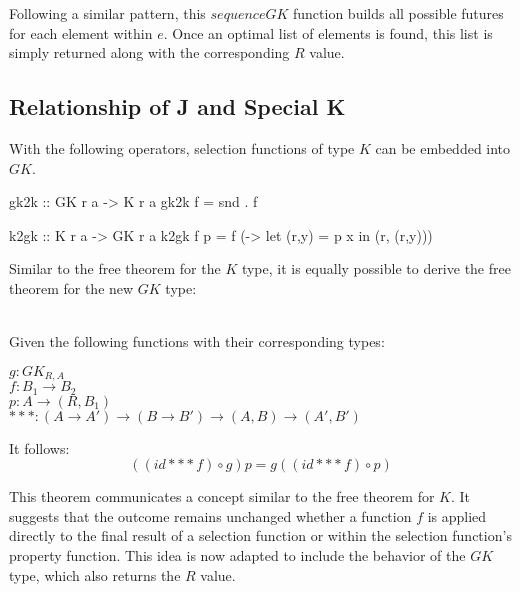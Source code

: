 \documentclass[runningheads]{llncs}
\newenvironment{reasoning}{\begin{adjustwidth}{0.2in}{}}{\end{adjustwidth}}
\newcommand{\ignore}[1]{}
\begin{document}
Following a similar pattern, this \(sequenceGK\) function builds all
possible futures for each element within \(e\). Once an optimal list of
elements is found, this list is simply returned along with the
corresponding \(R\) value.

\subsection{Relationship of J and Special
K}\label{relationship-of-j-and-special-k}

With the following operators, selection functions of type \(K\) can be
embedded into \(GK\).

\ignore{

> gk2k :: forall r a b. ((a -> (r,b)) -> (r,b)) -> ((a -> (r,b)) -> b)
> gk2k f = snd . f

}

\begin{haskell}
gk2k :: GK r a -> K r a 
gk2k f = snd . f
\end{haskell}

\begin{code}
k2gk :: K r a -> GK r a
k2gk f p = f (\x -> let (r,y) = p x in (r, (r,y)))
\end{code}

Similar to the free theorem for the \(K\) type, it is equally possible
to derive the free theorem \cite{wadler1989theorems} for the new \(GK\)
type:

\begin{theorem}\\
Given the following functions with their corresponding types:
\begin{reasoning}
  $g : GK_{R,A}$\\
  $f : B_1 \rightarrow B_2$\\
  $p : A \rightarrow (R, B_1)$\\
  $*** : (A \rightarrow A') \rightarrow (B \rightarrow B') \rightarrow (A,B) \rightarrow (A',B')$\\
\end{reasoning}
It follows:
\[((id *** f) \circ g) p = g ((id *** f) \circ p)\]
\end{theorem}

This theorem communicates a concept similar to the free theorem for
\(K\). It suggests that the outcome remains unchanged whether a function
\(f\) is applied directly to the final result of a selection function or
within the selection function's property function. This idea is now
adapted to include the behavior of the \(GK\) type, which also returns
the \(R\) value.
\end{document}
